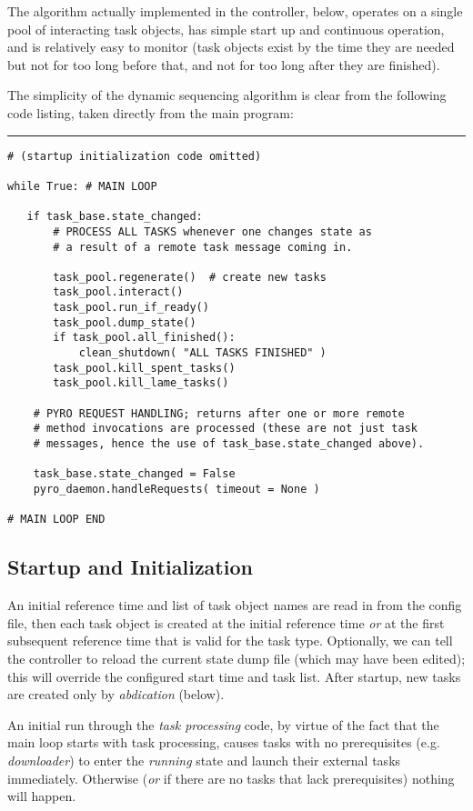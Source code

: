 \documentclass[11pt,a4paper]{report}
\begin{document}
The algorithm actually implemented in the controller, below, operates on
a single pool of interacting task objects, has simple start up and
continuous operation, and is relatively easy to monitor (task objects
exist by the time they are needed but not for too long before that, and
not for too long after they are finished). 

The simplicity of the dynamic sequencing algorithm is clear from the
following code listing, taken directly from the main program:

\pagebreak

\noindent
\rule{5cm}{.2mm}
\begin{lstlisting}
# (startup initialization code omitted)

while True: # MAIN LOOP

   if task_base.state_changed:
       # PROCESS ALL TASKS whenever one changes state as
       # a result of a remote task message coming in.

       task_pool.regenerate()  # create new tasks
       task_pool.interact()
       task_pool.run_if_ready()
       task_pool.dump_state()
       if task_pool.all_finished():
           clean_shutdown( "ALL TASKS FINISHED" )
       task_pool.kill_spent_tasks()
       task_pool.kill_lame_tasks()

    # PYRO REQUEST HANDLING; returns after one or more remote
    # method invocations are processed (these are not just task
    # messages, hence the use of task_base.state_changed above).

    task_base.state_changed = False
    pyro_daemon.handleRequests( timeout = None )

# MAIN LOOP END
\end{lstlisting}


\subsection{Startup and Initialization}

An initial reference time and list of task object names are read in from
the config file, then each task object is created at the initial
reference time {\em or} at the first subsequent reference time that is
valid for the task type. Optionally, we can tell the controller to
reload the current state dump file (which may have been edited); this
will override the configured start time and task list. After startup,
new tasks are created only by {\em abdication} (below).

An initial run through the {\em task processing} code, by virtue of the
fact that the main loop starts with task processing, causes tasks with
no prerequisites (e.g. {\em downloader}) to enter the {\em running}
state and launch their external tasks immediately. Otherwise ({\em or}
if there are no tasks that lack prerequisites) nothing will happen.
\end{document}
